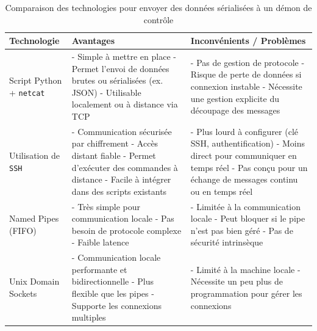 \documentclass{article}
\begin{document}
\begin{table}[H]
    \centering
    \caption{Comparaison des technologies pour envoyer des données sérialisées à un démon de contrôle}
    \begin{tabularx}{\textwidth}{|l|X|X|}
      \hline
      \textbf{Technologie} & \textbf{Avantages} & \textbf{Inconvénients / Problèmes} \\
      \hline
      Script Python + \texttt{netcat} & 
      - Simple à mettre en place \newline
      - Permet l'envoi de données brutes ou sérialisées (ex. JSON) \newline
      - Utilisable localement ou à distance via TCP &
      - Pas de gestion de protocole \newline
      - Risque de perte de données si connexion instable \newline
      - Nécessite une gestion explicite du découpage des messages \\
      \hline
      Utilisation de \texttt{SSH} & 
      - Communication sécurisée par chiffrement \newline
      - Accès distant fiable \newline
      - Permet d’exécuter des commandes à distance \newline
      - Facile à intégrer dans des scripts existants &
      - Plus lourd à configurer (clé SSH, authentification) \newline
      - Moins direct pour communiquer en temps réel \newline
      - Pas conçu pour un échange de messages continu ou en temps réel \\
      \hline
      Named Pipes (FIFO) & 
      - Très simple pour communication locale \newline
      - Pas besoin de protocole complexe \newline
      - Faible latence &
      - Limitée à la communication locale \newline
      - Peut bloquer si le pipe n’est pas bien géré \newline
      - Pas de sécurité intrinsèque \\
      \hline
      Unix Domain Sockets & 
      - Communication locale performante et bidirectionnelle \newline
      - Plus flexible que les pipes \newline
      - Supporte les connexions multiples &
      - Limité à la machine locale \newline
      - Nécessite un peu plus de programmation pour gérer les connexions \\

\end{tabularx}
\end{table}
\end{document}
